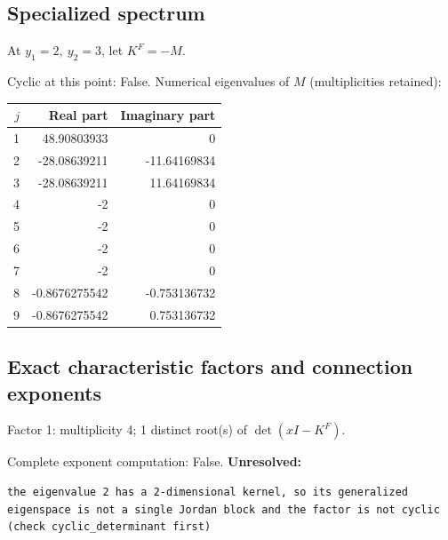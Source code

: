 \documentclass[10pt,a4paper]{article}
\newcommand{\fitmath}[1]{\sbox{\mathbox}{$\displaystyle #1$}\ifdim\wd\mathbox>\linewidth\resizebox{\linewidth}{!}{\usebox{\mathbox}}\else\usebox{\mathbox}\fi}
\begin{document}
\subsection*{Specialized spectrum}
At $y_1=2,\ y_2=3$, let $K^F=-M$.
\begin{center}\fitmath{\Delta=0}\end{center}
Cyclic at this point: False.
Numerical eigenvalues of $M$ (multiplicities retained):
\begin{center}\small\begin{tabular}{rrr}\toprule $j$ & Real part & Imaginary part\\\midrule
1 & 48.90803933 & 0\\
2 & -28.08639211 & -11.64169834\\
3 & -28.08639211 & 11.64169834\\
4 & -2 & 0\\
5 & -2 & 0\\
6 & -2 & 0\\
7 & -2 & 0\\
8 & -0.8676275542 & -0.753136732\\
9 & -0.8676275542 & 0.753136732\\
\bottomrule\end{tabular}\end{center}
\subsection*{Exact characteristic factors and connection exponents}
Factor 1: multiplicity 4; 1 distinct root(s) of $\det(xI-K^F)$.
\begin{center}\fitmath{\begin{aligned}p_{1}(x)&=x - 2\end{aligned}}\end{center}
Complete exponent computation: False.
\textbf{Unresolved:}

\begin{lstlisting}
the eigenvalue 2 has a 2-dimensional kernel, so its generalized eigenspace is not a single Jordan block and the factor is not cyclic (check cyclic_determinant first)
\end{lstlisting}
\end{document}
